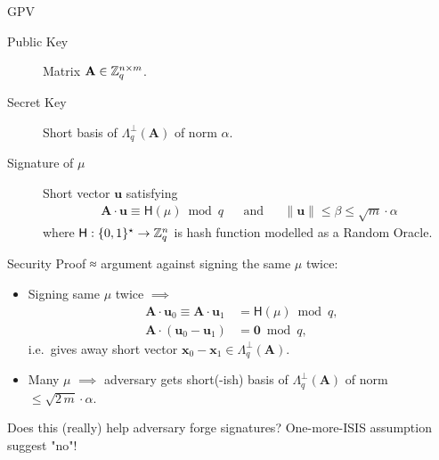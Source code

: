 \documentclass[xcolor=table,10pt,aspectratio=169]{beamer}
\renewcommand{\vec}[1]{\ensuremath{\mathbf{#1}}\xspace}
\newcommand{\norm}[1]{\left\lVert#1\right\rVert}
\providecommand{\mat}[1]{\ensuremath{\vec{#1}}\xspace}
\begin{document}
\begin{frame}[label={sec:org8499964}]{GPV}
\begin{description}
\item[{Public Key}] Matrix \(\mat{A} \in \ZZ_q^{n \times m}\).
\item[{Secret Key}] Short basis of \(\Lambda_q^\bot(\mat{A})\) of norm \(\alpha\).
\item[{Signature of \(\mu\)}] Short vector \(\vec{u}\) satisfying
\[\begin{aligned}
  \mat{A} \cdot \vec{u} \equiv \mathsf{H}(\mu) \bmod q && \text{and} && \norm{\vec{u}} \leq \beta \leq \sqrt{m} \cdot \alpha
  \end{aligned}\]
where \(\mathsf{H}: \{0,1\}^{\star} \to \mathbb{Z}_q^n\) is hash function modelled as a Random Oracle.
\end{description}
\end{frame}

\begin{frame}[label={sec:org607481d}]{Security Proof ≈ argument against signing the same \(\mu\) twice:}
\begin{itemize}
\item Signing same \(\mu\) twice \(\implies\)
\[\begin{aligned}
  \mat{A} \cdot \vec{u}_0 \equiv \mat{A} \cdot \vec{u}_1 &= \mathsf{H}(\mu) \bmod q, \\
  \mat{A} \cdot (\vec{u}_0 - \vec{u}_1) &= \vec{0} \bmod q,
  \end{aligned}\]
i.e. gives away short vector \(\vec{x}_0 - \vec{x}_1 \in \Lambda_q^\bot(\mat{A})\).
\item Many \(\mu\) \(\implies\) adversary gets short(-ish) basis of \(\Lambda_q^\bot(\mat{A})\) of norm \(\leq \sqrt{2\,m} \cdot \alpha\).
\end{itemize}

\begin{alertblock}{Does this (really) help adversary forge signatures?}
One-more-ISIS assumption suggest "no"!
\end{alertblock}
\end{frame}
\end{document}
